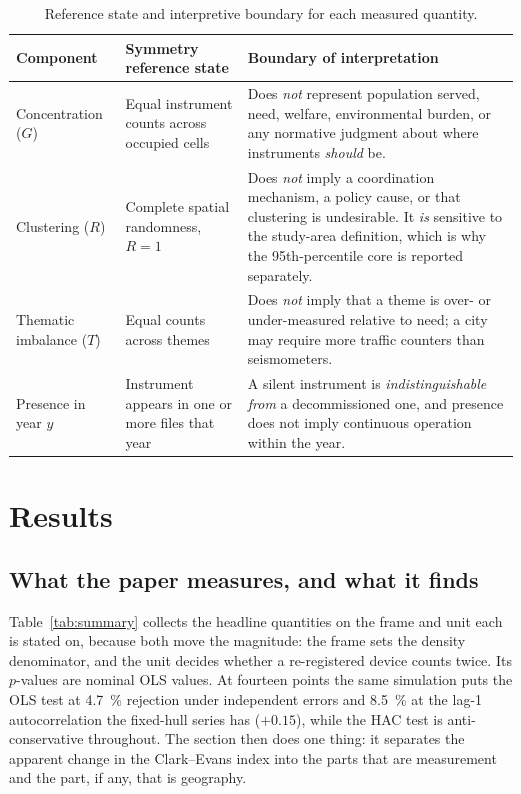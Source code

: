 \documentclass{article}
\newcommand{\olsSizeIid}{4.7}
\newcommand{\olsSizeAr}{8.5}
\begin{document}
\begin{table}[htbp]
\centering
\caption{Reference state and interpretive boundary for each measured quantity.}
\label{tab:boundaries}
\footnotesize
\setlength{\tabcolsep}{4pt}
\begin{tabular}{p{2.2cm}p{3.4cm}p{6.9cm}}
\toprule
Component & Symmetry reference state & Boundary of interpretation \\
\midrule
\noindent Concentration ($G$) & Equal instrument counts across occupied cells &
Does \emph{not} represent population served, need, welfare, environmental burden, or
any normative judgment about where instruments \emph{should} be. \\
\addlinespace
\noindent Clustering ($R$) & Complete spatial randomness, $R = 1$ &
Does \emph{not} imply a coordination mechanism, a policy cause, or that clustering is
undesirable. It \emph{is} sensitive to the study-area definition, which is why the
95th-percentile core is reported separately. \\
\addlinespace
\noindent Thematic imbalance ($T$) & Equal counts across themes &
Does \emph{not} imply that a theme is over- or under-measured relative to need; a city
may require more traffic counters than seismometers. \\
\addlinespace
\noindent Presence in year $y$ & Instrument appears in one or more files that year &
A silent instrument is \emph{indistinguishable from} a decommissioned one, and presence
does not imply continuous operation within the year. \\
\bottomrule
\end{tabular}
\end{table}

\section{Results}
\label{sec:results}

\subsection{What the paper measures, and what it finds}
\label{sec:results-summary}

Table~\ref{tab:summary} collects the headline quantities on the frame and unit each is stated
on, because both move the magnitude: the frame sets the density denominator, and the unit decides
whether a re-registered device counts twice. Its $p$-values are nominal OLS values. At fourteen
points the same simulation puts the OLS test at \SI{\olsSizeIid}{\percent} rejection under
independent errors and \SI{\olsSizeAr}{\percent} at the lag-1 autocorrelation the fixed-hull
series has ($+0.15$), while the HAC test is anti-conservative throughout. The section then does
one thing: it separates the apparent change in the Clark--Evans index
into the parts that are measurement and the part, if any, that is geography.
\end{document}
